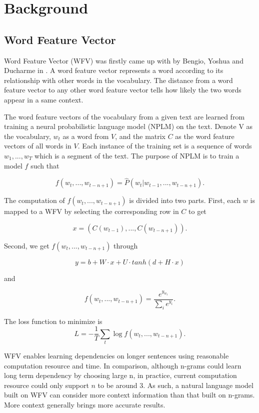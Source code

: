 \documentclass[modernstyle,12pt]{sjsuthesis}
\theoremstyle{definition}
\begin{document}
\chapter{Background}\label{chap:background}
\section{Word Feature Vector}

Word Feature Vector (WFV) was firstly came up with by Bengio, Yoshua and Ducharme in \cite{bengio2003neural}. A word feature vector represents a word according to its relationship with other words in the vocabulary. The distance from a word feature vector to any other word feature vector tells how likely the two words appear in a same context.

The word feature vectors of the vocabulary from a given text are learned from training a neural probabilistic language model (NPLM) on the text. Denote V as the vocabulary, $w_t$ as a word from $V$, and the matrix $C$ as the word feature vectors of all words in $V$. Each instance of the training set is a sequence of words $w_1,...,w_T$ which is a segment of the text. The purpose of NPLM is to train a model $f$ such that

$$ f(w_t, ..., w_{t-n+1}) = \hat{P}(w_t | w_{t-1},...,w_{t-n+1}).$$

The computation of $f(w_t, ..., w_{t-n+1})$ is divided into two parts.
First, each $w$ is mapped to a WFV by selecting the corresponding row in $C$ to get

$$x=(C(w_{t-1}),... ,C(w_{t-n+1})).$$

Second, we get $f(w_t, ..., w_{t-n+1})$ through

$$y=b+W\cdot x + U\cdot tanh(d + H\cdot x)$$

and

$$ f(w_t, ..., w_{t-n+1}) = \frac{e^{y_{w_t}}}{\sum_{i}^{}e^{y_i}}.$$

The loss function to minimize is $$L = -\frac{1}{T}\sum _{t}^{} \log{f(w_t, ..., w_{t-n+1})}.$$


WFV enables learning dependencies on longer sentences using reasonable computation resource and time. In comparison, although n-grams could learn long term dependency by choosing large n, in practice, current computation resource could only support $n$ to be around 3. As such, a natural language model built on WFV can consider more context information than that built on n-grams. More context generally brings more accurate results.
\end{document}
